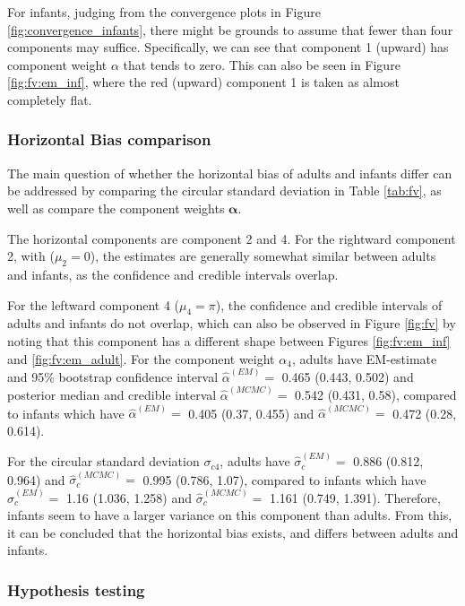 For infants, judging from the convergence plots in Figure \ref{fig:convergence_infants}, there might be grounds to assume that fewer than four components may suffice. Specifically, we can see that component 1 (upward) has component weight $\alpha$ that tends to zero. This can also be seen in Figure \ref{fig:fv:em_inf}, where the red (upward) component 1 is taken as almost completely flat.


\subsubsection{Horizontal Bias comparison} \label{horbias}

The main question of whether the horizontal bias of adults and infants differ can be addressed by comparing the circular standard deviation in Table \ref{tab:fv}, as well as compare the component weights \(\boldsymbol{\alpha}\).

The horizontal components are component 2 and 4. For the rightward component 2, with (\(\mu_2 = 0\)), the estimates are generally somewhat similar between adults and infants, as the confidence and credible intervals overlap.

For the leftward component 4 (\(\mu_4 = \pi\)), the confidence and credible intervals of adults and infants do not overlap, which can also be observed in Figure \ref{fig:fv} by noting that this component has a different shape between Figures \ref{fig:fv:em_inf} and \ref{fig:fv:em_adult}. For the component weight \(\alpha_4\), adults have EM-estimate and 95\% bootstrap confidence interval \(\hat\alpha^{(EM)} =\) 0.465 (0.443, 0.502) and posterior median and credible interval \(\hat\alpha^{(MCMC)} = \) 0.542 (0.431, 0.58), compared to infants which have \(\hat\alpha^{(EM)} = \) 0.405 (0.37, 0.455) and \(\hat\alpha^{(MCMC)} = \) 0.472 (0.28, 0.614).

For the circular standard deviation \(\sigma_{c4}\), adults have \(\hat\sigma_c^{(EM)} =\) 0.886 (0.812, 0.964) and  \(\hat\sigma_c^{(MCMC)} = \) 0.995 (0.786, 1.07), compared to infants which have \(\hat\sigma_c^{(EM)} = \) 1.16 (1.036, 1.258) and \(\hat\sigma_c^{(MCMC)} = \) 1.161 (0.749, 1.391). Therefore, infants seem to have a larger variance on this component than adults. From this, it can be concluded that the horizontal bias exists, and differs between adults and infants.

\subsubsection{Hypothesis testing}

